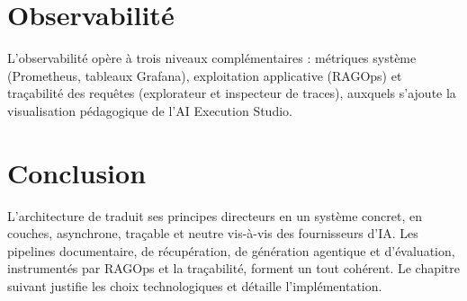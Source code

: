 \section{Observabilité}
L'observabilité opère à trois niveaux complémentaires : métriques système
(Prometheus, tableaux Grafana), exploitation applicative (RAGOps) et traçabilité
des requêtes (explorateur et inspecteur de traces), auxquels s'ajoute la
visualisation pédagogique de l'AI Execution Studio.

\section{Conclusion}
L'architecture de \devpilot{} traduit ses principes directeurs en un système
concret, en couches, asynchrone, traçable et neutre vis-à-vis des fournisseurs
d'IA. Les pipelines documentaire, de récupération, de génération agentique et
d'évaluation, instrumentés par RAGOps et la traçabilité, forment un tout cohérent.
Le chapitre suivant justifie les choix technologiques et détaille l'implémentation.
